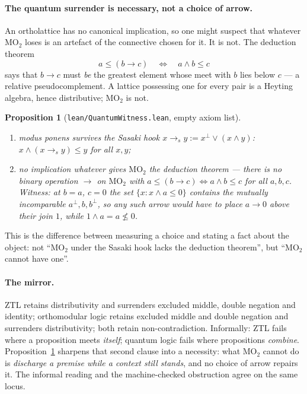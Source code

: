 \documentclass[11pt]{article}
\newtheorem{prop}[lem]{Proposition}
\theoremstyle{remark}
\begin{document}
\paragraph{The quantum surrender is necessary, not a choice of arrow.}
An ortholattice has no canonical implication, so one might suspect that
whatever $\mathrm{MO}_2$ loses is an artefact of the connective chosen for
it. It is not. The deduction theorem
\[
  a \le (b \to c) \quad\Longleftrightarrow\quad a \wedge b \le c
\]
says that $b \to c$ must \emph{be} the greatest element whose meet with $b$
lies below $c$ --- a relative pseudocomplement. A lattice possessing one for
every pair is a Heyting algebra, hence distributive; $\mathrm{MO}_2$ is not.

\begin{prop}[\texttt{lean/QuantumWitness.lean}, empty axiom list]\label{propB2}
\leavevmode
\begin{enumerate}
\item[(i)] \emph{modus ponens survives} the Sasaki hook
$x \to_s y := x^{\perp} \vee (x \wedge y)$: \; $x \wedge (x \to_s y) \le y$
for all $x,y$;
\item[(ii)] \emph{no implication whatever gives $\mathrm{MO}_2$ the deduction
theorem} --- there is no binary operation $\to$ on $\mathrm{MO}_2$ with
$a \le (b \to c) \Leftrightarrow a \wedge b \le c$ for all $a,b,c$. Witness:
at $b = a$, $c = 0$ the set $\{x : x \wedge a \le 0\}$ contains the mutually
incomparable $a^{\perp}, b, b^{\perp}$, so any such arrow would have to place
$a \to 0$ above their join $1$, while $1 \wedge a = a \not\le 0$.
\end{enumerate}
\end{prop}

This is the difference between measuring a choice and stating a fact about
the object: not ``$\mathrm{MO}_2$ under the Sasaki hook lacks the deduction
theorem'', but ``$\mathrm{MO}_2$ cannot have one''.

\paragraph{The mirror.} ZTL retains distributivity and surrenders excluded
middle, double negation and identity; orthomodular logic retains excluded
middle and double negation and surrenders distributivity; both retain
non-contradiction. Informally: ZTL fails where a proposition meets
\emph{itself}; quantum logic fails where propositions \emph{combine}.
Proposition~\ref{propB2} sharpens that second clause into a necessity: what
$\mathrm{MO}_2$ cannot do is \emph{discharge a premise while a context still
stands}, and no choice of arrow repairs it. The informal reading and the
machine-checked obstruction agree on the same locus.
\end{document}
